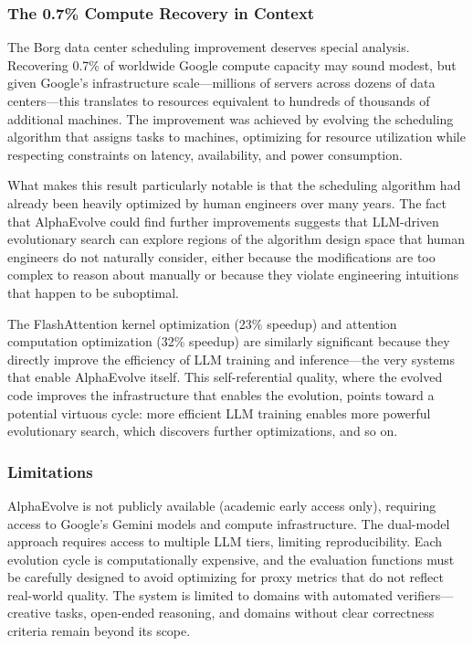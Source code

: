 \subsubsection{The 0.7\% Compute Recovery in Context}

The Borg data center scheduling improvement deserves special analysis. Recovering 0.7\% of worldwide Google compute capacity may sound modest, but given Google's infrastructure scale---millions of servers across dozens of data centers---this translates to resources equivalent to hundreds of thousands of additional machines. The improvement was achieved by evolving the scheduling algorithm that assigns tasks to machines, optimizing for resource utilization while respecting constraints on latency, availability, and power consumption.

What makes this result particularly notable is that the scheduling algorithm had already been heavily optimized by human engineers over many years. The fact that AlphaEvolve could find further improvements suggests that LLM-driven evolutionary search can explore regions of the algorithm design space that human engineers do not naturally consider, either because the modifications are too complex to reason about manually or because they violate engineering intuitions that happen to be suboptimal.

The FlashAttention kernel optimization (23\% speedup) and attention computation optimization (32\% speedup) are similarly significant because they directly improve the efficiency of LLM training and inference---the very systems that enable AlphaEvolve itself. This self-referential quality, where the evolved code improves the infrastructure that enables the evolution, points toward a potential virtuous cycle: more efficient LLM training enables more powerful evolutionary search, which discovers further optimizations, and so on.

\subsubsection{Limitations}

AlphaEvolve is not publicly available (academic early access only), requiring access to Google's Gemini models and compute infrastructure. The dual-model approach requires access to multiple LLM tiers, limiting reproducibility. Each evolution cycle is computationally expensive, and the evaluation functions must be carefully designed to avoid optimizing for proxy metrics that do not reflect real-world quality. The system is limited to domains with automated verifiers---creative tasks, open-ended reasoning, and domains without clear correctness criteria remain beyond its scope.

